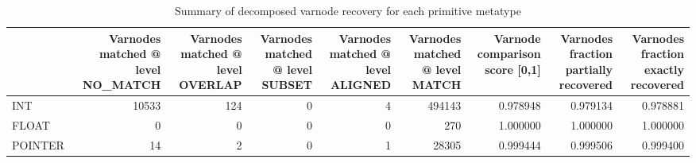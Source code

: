 \begin{table}
\centering
\caption{Summary of decomposed varnode recovery for each primitive metatype}
\label{table:metatype-recovery-summary-with-levels-decomposed}
\begin{tabular}{lrrrrrrrr}
\toprule
{} &  Varnodes matched @ level NO\_MATCH &  Varnodes matched @ level OVERLAP &  Varnodes matched @ level SUBSET &  Varnodes matched @ level ALIGNED &  Varnodes matched @ level MATCH &  Varnode comparison score [0,1] &  Varnodes fraction partially recovered &  Varnodes fraction exactly recovered \\
\midrule
INT     &                              10533 &                               124 &                                0 &                                 4 &                          494143 &                        0.978948 &                               0.979134 &                             0.978881 \\
FLOAT   &                                  0 &                                 0 &                                0 &                                 0 &                             270 &                        1.000000 &                               1.000000 &                             1.000000 \\
POINTER &                                 14 &                                 2 &                                0 &                                 1 &                           28305 &                        0.999444 &                               0.999506 &                             0.999400 \\
\bottomrule
\end{tabular}
\end{table}
